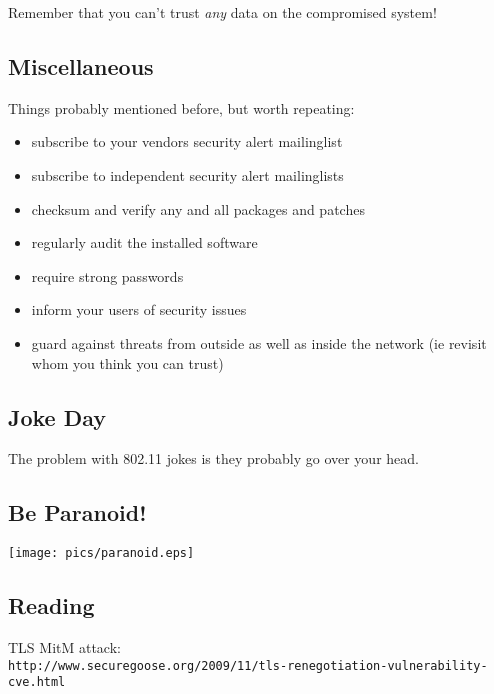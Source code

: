 \documentclass[xga]{xdvislides}
\begin{document}
Remember that you can't trust {\em any} data on the compromised system!

\subsection{Miscellaneous}
Things probably mentioned before, but worth repeating:
\begin{itemize}
	\item subscribe to your vendors security alert mailinglist
	\item subscribe to independent security alert mailinglists
	\item checksum and verify any and all packages and patches
	\item regularly audit the installed software
	\item require strong passwords
	\item inform your users of security issues
	\item guard against threats from outside as well as inside the network
		(ie revisit whom you think you can trust)
\end{itemize}

\subsection{Joke Day}
\vspace*{\fill}
\begin{center}
\Huge
The problem with 802.11 jokes is they probably go over your head.
\Normalsize
\end{center}
\vspace*{\fill}



\subsection{Be Paranoid!}
\begin{center}
	\texttt{[image: pics/paranoid.eps]}
\end{center}

\subsection{Reading}
TLS MitM attack:
\\

\verb+http://www.securegoose.org/2009/11/tls-renegotiation-vulnerability-cve.html+ \\
\end{document}
